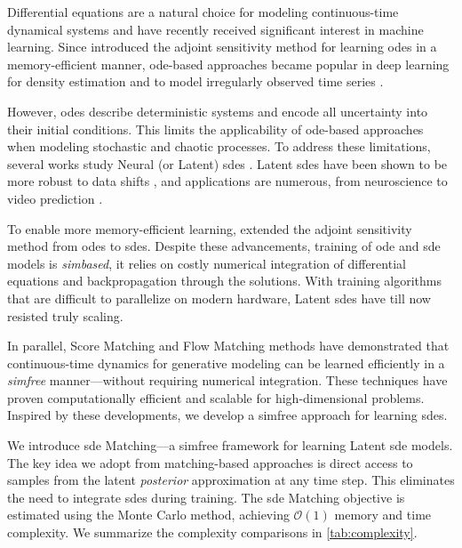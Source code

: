 \documentclass{article}
\def\O{\mathcal{O}}
\theoremstyle{plain}
\theoremstyle{definition}
\theoremstyle{remark}
\begin{document}
Differential equations are a natural choice for modeling continuous-time dynamical systems and have recently received significant interest in machine learning. Since \citet{chen2018neural} introduced the adjoint sensitivity method for learning \glspl{ode} in a memory-efficient manner, \gls{ode}-based approaches became popular in deep learning for density estimation \cite{grathwohl2018scalable} and to model irregularly observed time series \cite{yildiz2019ode2vae, rubanova2019latent}.

However, \glspl{ode} describe deterministic systems and encode all uncertainty into their initial conditions. This limits the applicability of \gls{ode}-based approaches when modeling stochastic and chaotic processes. To address these limitations, several works study Neural (or Latent) \glspl{sde} \citep{movellan2002monte,ha2018adaptive,tzen2019neural,peluchetti2020infinitely,hodgkinson2020stochastic}. Latent \glspl{sde} have been shown to be more robust to data shifts \citep{oh2024stable}, and applications are numerous, from neuroscience \citep{elgazzar2024generative} to video prediction \citep{daems2024variational}.

To enable more memory-efficient learning, \citet{li2020scalable} extended the adjoint sensitivity method from \glspl{ode} to \glspl{sde}.
Despite these advancements, training of \gls{ode} and \gls{sde} models is \emph{\gls{simbased}}, it relies on costly numerical integration of differential equations and backpropagation through the solutions. With training algorithms that are difficult to parallelize on modern hardware, Latent \glspl{sde} have till now resisted truly scaling. 


In parallel, Score Matching \citep{ho2020denoising, song2021scorebased} and Flow Matching methods \citep{lipman2023flow, albergo2023stochastic, liu2023flow} have demonstrated that continuous-time dynamics for generative modeling can be learned efficiently in a \emph{\gls{simfree}} manner—without requiring numerical integration. These techniques have proven computationally efficient and scalable for high-dimensional problems. Inspired by these developments, we develop a \gls{simfree} approach for learning \glspl{sde}.


We introduce \gls{sde} Matching—a \gls{simfree} framework for learning Latent \gls{sde} models. The key idea we adopt from matching-based approaches is direct access to samples from the latent \emph{posterior} approximation at any time step. This eliminates the need to integrate \glspl{sde} during training. The \gls{sde} Matching objective is estimated using the Monte Carlo method, achieving $\O(1)$ memory and time complexity. We summarize the complexity comparisons in \cref{tab:complexity}.
\end{document}
